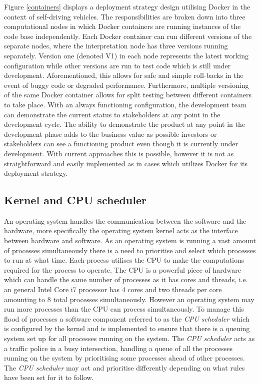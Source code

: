 Figure \ref{containers} displays a deployment strategy design utilising Docker in the context of self-driving vehicles. The responsibilities are broken down into three computational nodes in which Docker containers are running instances of the code base independently. Each Docker container can run different versions of the separate nodes, where the interpretation node has three versions running separately. Version one (denoted V1) in each node represents the latest working configuration while other versions are run to test code which is still under development. Aforementioned, this allows for safe and simple roll-backs in the event of buggy code or degraded performance. Furthermore, multiple versioning of the same Docker container allows for split testing between different containers to take place. With an always functioning configuration, the development team can demonstrate the current status to stakeholders at any point in the development cycle. The ability to demonstrate the product at any point in the development phase adds to the business value as possible investors or stakeholders can see a functioning product even though it is currently under development. With current approaches this is possible, however it is not as straightforward and easily implemented as in cases which utilizes Docker for its deployment strategy.

\subsection{Kernel and CPU scheduler}

An operating system handles the communication between the software and the hardware, more specifically the operating system kernel acts as the interface between hardware and software. As an operating system is running a vast amount of processes simultaneously there is a need to prioritise and select which processes to run at what time. Each process utilises the CPU to make the computations required for the process to operate. The CPU is a powerful piece of hardware which can handle the same number of processes as it has cores and threads, i.e. an general Intel Core i7 processor has 4 cores and two threads per core amounting to 8 total processes simultaneously. However an operating system may run more processes than the CPU can process simultaneously. To manage this flood of processes a software component referred to as the \textit{CPU scheduler} which is configured by the kernel and is implemented to ensure that there is a queuing system set up for all processes running on the system. The \textit{CPU scheduler} acts as a traffic police in a busy intersection, handling a queue of all the processes running on the system by prioritising some processes ahead of other processes. The \textit{CPU scheduler} may act and prioritise differently depending on what rules have been set for it to follow.\\


